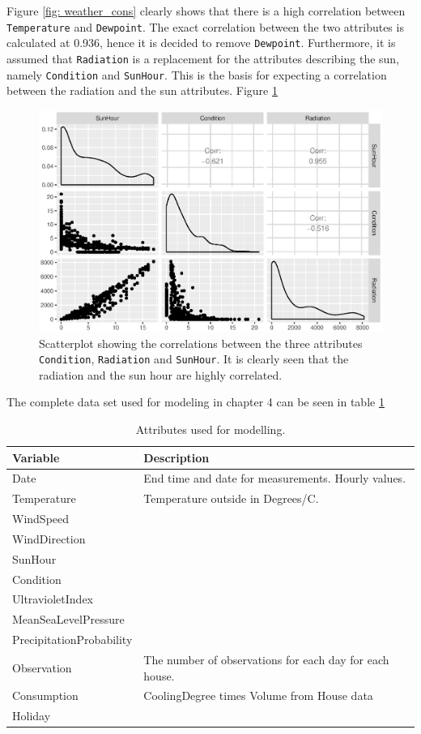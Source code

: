 \noindent Figure \ref{fig: weather_cons} clearly shows that there is a high correlation between \texttt{Temperature} and \texttt{Dewpoint}. The exact correlation between the two attributes is calculated at 0.936, hence it is decided to remove \texttt{Dewpoint}. Furthermore, it is assumed that \texttt{Radiation} is a replacement for the attributes describing the sun, namely \texttt{Condition} and \texttt{SunHour}. This is the basis for expecting a correlation between the radiation and the sun attributes. Figure \ref{fig: gg_cor} 

\begin{figure}
    \centering
    \includegraphics[width=.8\textwidth]{../../../figures/gg_cor.eps}
    \caption{Scatterplot showing the correlations between the three attributes \texttt{Condition}, \texttt{Radiation} and \texttt{SunHour}. It is clearly seen that the radiation and the sun hour are highly correlated.}
    \label{fig: gg_cor}
\end{figure}



\noindent The complete data set used for modeling in chapter 4 can be seen in table \ref{tab: modeldata} 
\begin{table}
    \centering
    \begin{tabular}{ll}
     \hline
     \textbf{Variable} & \textbf{Description} \\
    \hline
    \hline
    Date  &  End time and date for measurements. Hourly values.\\
    Temperature  &  Temperature outside in Degrees/C. \\
    WindSpeed  &  \\
    WindDirection  &  \\
    SunHour  &  \\
    Condition  & \\
    UltravioletIndex  &   \\
    MeanSeaLevelPressure  & \\
    PrecipitationProbability & \\
    Observation & The number of observations for each day for each house.\\
    Consumption & CoolingDegree times Volume from House data \\
    Holiday & \\
    \hline
    \end{tabular}
    \caption{Attributes used for modelling.}
    \label{tab: modeldata}
\end{table}   